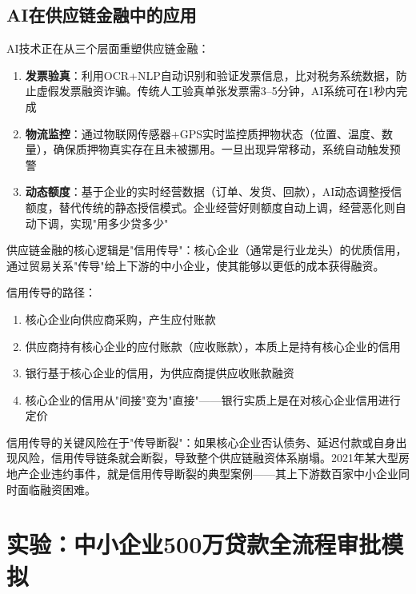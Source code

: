 \subsection{AI在供应链金融中的应用}

AI技术正在从三个层面重塑供应链金融：

\begin{enumerate}[leftmargin=2em]
  \item \textbf{发票验真}：利用OCR+NLP自动识别和验证发票信息，比对税务系统数据，防止虚假发票融资诈骗。传统人工验真单张发票需3--5分钟，AI系统可在1秒内完成
  \item \textbf{物流监控}：通过物联网传感器+GPS实时监控质押物状态（位置、温度、数量），确保质押物真实存在且未被挪用。一旦出现异常移动，系统自动触发预警
  \item \textbf{动态额度}：基于企业的实时经营数据（订单、发货、回款），AI动态调整授信额度，替代传统的静态授信模式。企业经营好则额度自动上调，经营恶化则自动下调，实现"用多少贷多少"
\end{enumerate}

\begin{theorybox}[核心企业信用传导机制]
供应链金融的核心逻辑是"信用传导"：核心企业（通常是行业龙头）的优质信用，通过贸易关系"传导"给上下游的中小企业，使其能够以更低的成本获得融资。

信用传导的路径：
\begin{enumerate}[leftmargin=1em]
  \item 核心企业向供应商采购，产生应付账款
  \item 供应商持有核心企业的应付账款（应收账款），本质上是持有核心企业的信用
  \item 银行基于核心企业的信用，为供应商提供应收账款融资
  \item 核心企业的信用从"间接"变为"直接"——银行实质上是在对核心企业信用进行定价
\end{enumerate}

信用传导的关键风险在于"传导断裂"：如果核心企业否认债务、延迟付款或自身出现风险，信用传导链条就会断裂，导致整个供应链融资体系崩塌。2021年某大型房地产企业违约事件，就是信用传导断裂的典型案例——其上下游数百家中小企业同时面临融资困难。
\end{theorybox}

\section{实验：中小企业500万贷款全流程审批模拟}

